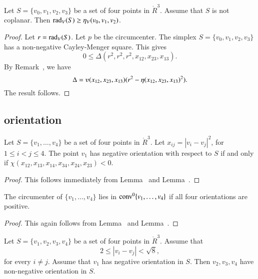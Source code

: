 \begin{lemma}
Let $S=\{v_0,v_1,v_2,v_3\}$ be a set of four points in $\ring{R}^3$.
Assume that $S$ is not coplanar.
Then $\operatorname{rad}_V(S) \ge \eta_V(v_0,v_1,v_2)$.
\end{lemma}

\begin{proof}  Let $r=\operatorname{rad}_V(S)$.  Let $p$ be the circumcenter.
The simplex $S=\{v_0,v_1,v_2,v_3\}$ has a non-negative 
Cayley-Menger
square.  This gives
  $$
  0\le \Delta(r^2,r^2,r^2,x_{12},x_{23},x_{13}).
  $$
By Remark~, we have
$$
\Delta = \ups(x_{12},x_{23},x_{13}) (r^2 - \eta(x_{12},x_{23},x_{13})^2).
$$
The result follows.
\end{proof}


\newpage
\subsection{orientation}



\begin{lemma} 
Let $S=\{v_1,\ldots,v_4\}$ be a set of four points
in $\ring{R}^3$.  
Let $x_{ij}=|v_i-v_j|^2$, for $1\le i< j\le 4$.
The point $v_1$ has negative
orientation with respect to $S$ if and only if
    $\chi(x_{12},x_{13},x_{14},x_{34},x_{24},
    x_{23})<0$.
\end{lemma}

\begin{proof} 
This follows immediately from  Lemma~ and 
Lemma~.
\end{proof}

\begin{lemma}
The circumenter of $\{v_1,\ldots,v_4\}$ lies in
${\operatorname{conv}}^0\{v_1,\ldots,v_4\}$ if all four
orientations are positive.
\end{lemma}

\begin{proof}  This again follows from
Lemma~ and 
Lemma~.
\end{proof}


\newpage

\begin{lemma} 
Let $S=\{v_1,v_2,v_3,v_4\}$ be a set of four points in $\ring{R}^3$.
Assume that 
   $$
   2\le |v_i-v_j| < \sqrt8,
   $$
for every $i\ne j$.
Assume that $v_1$ has negative orientation in $S$.  Then
$v_2,v_3,v_4$ have non-negative orientation in $S$.
\end{lemma}


